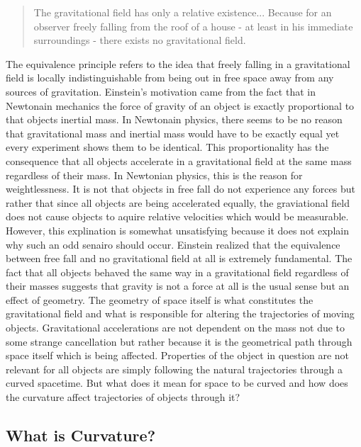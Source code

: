 \documentclass[11pt, a4paper]{article}
\begin{document}
\begin{quote}
The gravitational field has only a relative existence... Because for an observer freely falling from the roof of a house - at least in his immediate surroundings - there exists no gravitational field.
\end{quote}
The equivalence principle refers to the idea that freely falling in a gravitational field is locally indistinguishable from being out in free space away from any sources of gravitation. Einstein's motivation came from the fact that in Newtonain mechanics the force of gravity of an object is exactly proportional to that objects inertial mass. In Newtonain physics, there seems to be no reason that gravitational mass and inertial mass would have to be exactly equal yet every experiment shows them to be identical. This proportionality has the consequence that all objects accelerate in a gravitational field at the same mass regardless of their mass. In Newtonian physics, this is the reason for weightlessness. It is not that objects in free fall do not experience any forces but rather that since all objects are being accelerated equally, the graviational field does not cause objects to aquire relative velocities which would be measurable. However, this explination is somewhat unsatisfying because it does not explain why such an odd senairo should occur. Einstein realized that the equivalence between free fall and no gravitational field at all is extremely fundamental. The fact that all objects behaved the same way in a gravitational field regardless of their masses suggests that gravity is not a force at all is the usual sense but an effect of geometry. The geometry of space itself is what constitutes the gravitational field and what is responsible for altering the trajectories of moving objects. Gravitational accelerations are not dependent on the mass not due to some strange cancellation but rather because it is the geometrical path through space itself which is being affected. Properties of the object in question are not relevant for all objects are simply following the natural trajectories through a curved spacetime. But what does it mean for space to be curved and how does the curvature affect trajectories of objects through it?

\subsection{What is Curvature?}
\end{document}
